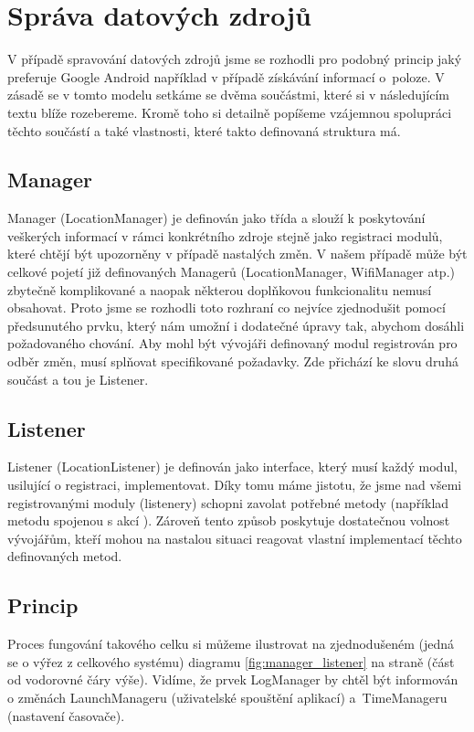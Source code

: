 \documentclass[thesis=M,czech]{FITthesis}[2012/06/26]
\begin{document}
\section{Správa datových zdrojů}\label{data_sources_management}
V případě spravování datových zdrojů jsme se rozhodli pro podobný princip jaký preferuje Google Android například v případě získávání informací o~poloze\cite{android_location}. V zásadě se v tomto modelu setkáme se dvěma součástmi, které si v následujícím textu blíže rozebereme. Kromě toho si detailně popíšeme vzájemnou spolupráci těchto součástí a také vlastnosti, které takto definovaná struktura má.

\subsection{Manager}
Manager (LocationManager\cite{android_location_manager}) je definován jako třída\cite{class} a slouží k poskytování veškerých informací v rámci konkrétního zdroje stejně jako registraci modulů, které chtějí být upozorněny v případě nastalých změn. V našem případě může být celkové pojetí již definovaných Managerů (LocationManager, WifiManager atp.) zbytečně komplikované a naopak některou doplňkovou funkcionalitu nemusí obsahovat. Proto jsme se rozhodli toto rozhraní co nejvíce zjednodušit pomocí předsunutého prvku, který nám umožní i dodatečné úpravy tak, abychom dosáhli požadovaného chování. Aby mohl být vývojáři definovaný modul registrován pro odběr změn, musí splňovat specifikované požadavky. Zde přichází ke slovu druhá součást a tou je Listener.

\subsection{Listener}
Listener (LocationListener\cite{android_location_listener}) je definován jako interface\cite{interface}, který musí každý modul, usilující o registraci, implementovat. Díky tomu máme jistotu, že jsme nad všemi registrovanými moduly (listenery) schopni zavolat potřebné metody (například metodu spojenou s akcí ). Zároveň tento způsob poskytuje dostatečnou volnost vývojářům, kteří mohou na nastalou situaci reagovat vlastní implementací těchto definovaných metod.

\subsection{Princip}
Proces fungování takového celku si můžeme ilustrovat na zjednodušeném (jedná se o výřez z celkového systému) diagramu \ref{fig:manager_listener} na straně \pageref{fig:manager_listener} (část od vodorovné čáry výše). Vidíme, že prvek LogManager by chtěl být informován o změnách LaunchManageru (uživatelské spouštění aplikací) a~TimeManageru (nastavení časovače).
\end{document}
